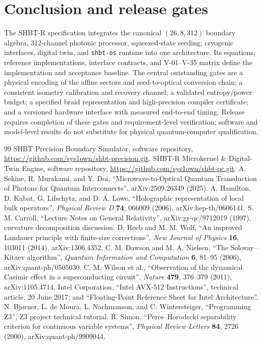 \documentclass[11pt,a4paper]{article}
\newcommand{\shbtos}{\texttt{shbt-os}}
\begin{document}
\section{Conclusion and release gates}
The SHBT-R specification integrates the canonical $(26,8,312)$ boundary algebra,
312-channel photonic processor, squeezed-state seeding, cryogenic interfaces, digital
twin, and \shbtos{} runtime into one architecture. Its equations, reference implementations,
interface contracts, and V-01--V-35 matrix define the implementation and acceptance baseline.
The central outstanding gates are a physical encoding of the affine sectors and seed-to-optical conversion
chain; a consistent isometry calibration and recovery channel; a validated entropy/power
budget; a specified braid representation and high-precision compiler certificate; and a
versioned hardware interface with measured end-to-end timing. Release requires completion
of these gates and requirement-level verification; software and model-level results do
not substitute for physical quantum-computer qualification.

\begin{thebibliography}{99}
 SHBT Precision Boundary Simulator, software repository,
\url{https://github.com/sys1own/shbt-precision.git}.
 SHBT-R Microkernel \& Digital-Twin Engine, software repository,
\url{https://github.com/sys1own/shbt-qc.git}.
 A. Sekine, R. Murakami, and Y. Doi,
``Microwave-to-Optical Quantum Transduction of Photons for Quantum Interconnects'',
arXiv:2509.26349 (2025).
 A. Hamilton, D. Kabat, G. Lifschytz, and D. A. Lowe,
``Holographic representation of local bulk operators'',
\emph{Physical Review D} \textbf{74}, 066009 (2006), arXiv:hep-th/0606141.
 S. M. Carroll, ``Lecture Notes on General Relativity'',
arXiv:gr-qc/9712019 (1997), curvature decomposition discussion.
 D. Reeb and M. M. Wolf, ``An improved Landauer principle with finite-size
corrections'', \emph{New Journal of Physics} \textbf{16}, 103011 (2014), arXiv:1306.4352.
 C. M. Dawson and M. A. Nielsen, ``The Solovay--Kitaev algorithm'',
\emph{Quantum Information and Computation} \textbf{6}, 81--95 (2006), arXiv:quant-ph/0505030.
 C. M. Wilson et al., ``Observation of the dynamical Casimir effect in a
superconducting circuit'', \emph{Nature} \textbf{479}, 376--379 (2011), arXiv:1105.4714.
 Intel Corporation, ``Intel AVX-512 Instructions'', technical article,
20 June 2017; and ``Floating-Point Reference Sheet for Intel Architecture''.
 N. Bj\o rner, L. de Moura, L. Nachmanson, and C. Wintersteiger,
``Programming Z3'', Z3 project technical tutorial.
 R. Simon, ``Peres--Horodecki separability criterion for continuous variable
systems'', \emph{Physical Review Letters} \textbf{84}, 2726 (2000), arXiv:quant-ph/9909044.
\end{thebibliography}
\end{document}
